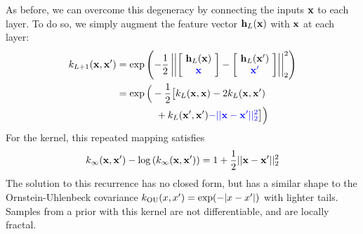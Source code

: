 \documentclass[twoside]{article}
\makeatletter
\newlength{\nonHumbleHeight}
\def\@humbleformat#1{{\settoheight{\nonHumbleHeight}{#1}\resizebox{!}{0.94\nonHumbleHeight}{#1}}}%
\newcommand\humble[1]{{\@humbleformat{#1}}}%
\newcommand{\gp}{{\humble{GP}}}
\newcommand{\hphi}{h}
\newcommand{\hPhi}{\vh}
\makeatother
\begin{document}
As before, we can overcome this degeneracy by %
connecting the inputs ${\bf{x}}$ to each layer.  To do so, we simply augment the feature vector $\hPhi_{L}(\vx)$ with ${\bf{x}}$ at each layer: 
%
\begin{align}
 k_{L+1}(\vx, \vx') %
& = \exp \left( -\frac{1}{2} \left|\left| \left[ \! \begin{array}{c} \hPhi_{L}(\vx) \\ {\color{blue} \vx} \end{array} \! \right]  - \left[ \! \begin{array}{c} \hPhi_{L}(\vx') \\ {\color{blue} \vx'} \end{array} \! \right] \right| \right|_2^2 \right) \nonumber \\
& = \exp \Big( -\frac{1}{2} \big[ k_{L}(\vx, \vx) - 2 k_{L}(\vx, \vx') \nonumber \\ 
& \qquad \qquad + k_{L}(\vx', \vx') {\color{blue} - || \vx - \vx' ||_2^2} \big] \Big)
\end{align}
%
For the \humble{SE} kernel, this repeated mapping satisfies
\begin{align}
k_\infty({\bf{x}}, {\bf{x}}') - \log \left( k_\infty({\bf{x}}, {\bf{x}}') \right) = 1 + \frac{1}{2} || {\bf{x}} - {\bf{x}}' ||_2^2
\end{align}
%
The solution to this recurrence has no closed form, but has a similar shape to the Ornstein-Uhlenbeck covariance ${k_{\textnormal{OU}}(x,x') = \exp( -|x - x'| )}$ with lighter tails.
%
Samples from a \gp{} prior with this kernel are not differentiable, and are locally fractal.
\end{document}
